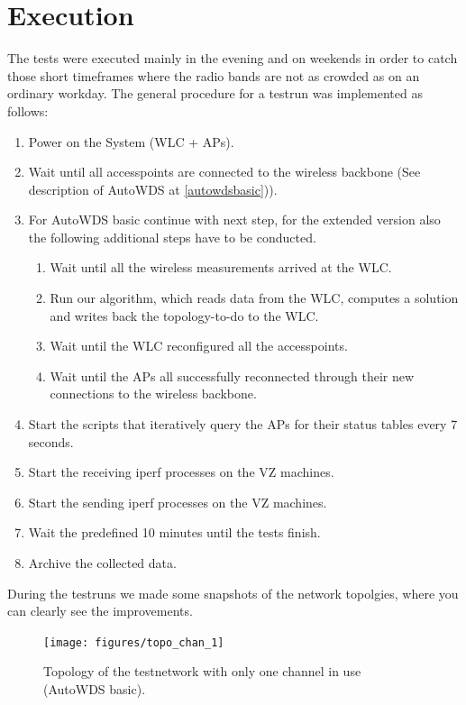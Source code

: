 \newpage
    
  \section{Execution}
    The tests were executed mainly in the evening and on weekends in order to catch those short timeframes where the radio bands are not as crowded as on an ordinary workday.
    The general procedure for a testrun was implemented as follows:
    \begin{enumerate}
      \item Power on the System (WLC + APs).
      \item Wait until all accesspoints are connected to the wireless backbone (See description of AutoWDS at \ref{autowdsbasic})).
      \item For AutoWDS basic continue with next step, for the extended version also the following additional steps have to be conducted.
	\begin{enumerate}
	 \item Wait until all the wireless measurements arrived at the \ac{WLC}.
	 \item Run our algorithm, which reads data from the WLC, computes a solution and writes back the topology-to-do to the WLC.
	 \item Wait until the WLC reconfigured all the accesspoints.
	 \item Wait until the APs all successfully reconnected through their new connections to the wireless backbone.
	\end{enumerate}
      \item Start the scripts that iteratively query the APs for their status tables every 7 seconds.
      \item Start the receiving iperf processes on the VZ machines.
      \item Start the sending iperf processes on the VZ machines.
      \item Wait the predefined 10 minutes until the tests finish.
      \item Archive the collected data.
    \end{enumerate}
    
\newpage

    During the testruns we made some snapshots of the network topolgies, where you can clearly see the improvements.    
    \begin{figure}[h!]
      \centering
	\texttt{[image: figures/topo\_chan\_1]}%
	\caption{Topology of the testnetwork with only one channel in use (AutoWDS basic).\protect\footnotemark }
      \label{fig:topo_chan_1}
    \end{figure}
    
